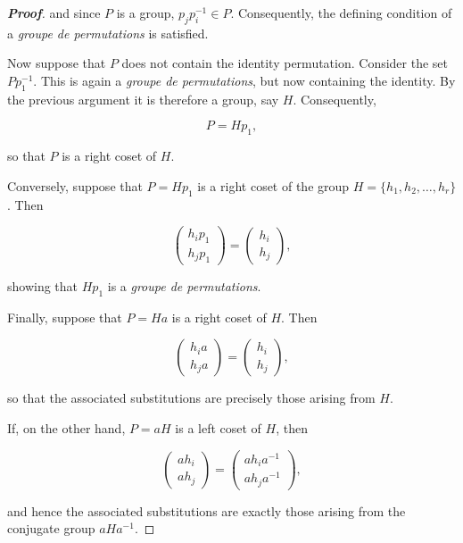 \documentclass[10pt,a4paper]{amsart}
\begin{document}
\begin{proof}[\normalfont\bfseries Proof]
	and since \(P\) is a group, \(p_jp_i^{-1}\in P\). Consequently, the defining condition of a \textit{groupe de permutations} is satisfied.
	
	Now suppose that \(P\) does not contain the identity permutation. Consider the set \(Pp_1^{-1}\). This is again a \textit{groupe de permutations}, but now containing the identity. By the previous argument it is therefore a group, say \(H\). Consequently,
	
	\[
	P=Hp_1,
	\]
	
	so that \(P\) is a right coset of \(H\).
	
	Conversely, suppose that \(P=Hp_1\) is a right coset of the group
	\(H=\{h_1,h_2,\dots,h_r\}\). Then
	
	\[
	\left(
	\begin{array}{c}
		h_ip_1\\
		h_jp_1
	\end{array}
	\right)
	=
	\left(
	\begin{array}{c}
		h_i\\
		h_j
	\end{array}
	\right),
	\]
	
	showing that \(Hp_1\) is a \textit{groupe de permutations}.
	
	Finally, suppose that \(P=Ha\) is a right coset of \(H\). Then
	
	\[
	\left(
	\begin{array}{c}
		h_ia\\
		h_ja
	\end{array}
	\right)
	=
	\left(
	\begin{array}{c}
		h_i\\
		h_j
	\end{array}
	\right),
	\]
	
	so that the associated substitutions are precisely those arising from \(H\).
	
	If, on the other hand, \(P=aH\) is a left coset of \(H\), then
	
	\[
	\left(
	\begin{array}{c}
		ah_i\\
		ah_j
	\end{array}
	\right)
	=
	\left(
	\begin{array}{c}
		ah_ia^{-1}\\
		ah_ja^{-1}
	\end{array}
	\right),
	\]
	
	and hence the associated substitutions are exactly those arising from the conjugate group \(aHa^{-1}\).
	
\end{proof}
\end{document}

